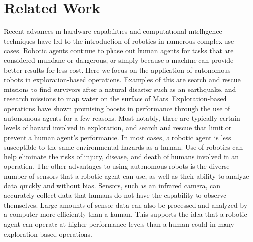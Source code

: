

\chapter{Related Work} \label{ch:related_works}
Recent advances in hardware capabilities and computational intelligence techniques have led to the introduction of robotics in numerous complex use cases.
Robotic agents continue to phase out human agents for tasks that are considered mundane or dangerous, or simply because a machine can provide better results for less cost.
Here we focus on the application of autonomous robots in exploration-based operations.
Examples of this are search and rescue missions to find survivors after a natural disaster such as an earthquake, and research missions to map water on the surface of Mars.
Exploration-based operations have shown promising boosts in performance through the use of autonomous agents for a few reasons.
Most notably, there are typically certain levels of hazard involved in exploration, and search and rescue that limit or prevent a human agent's performance.
In most cases, a robotic agent is less susceptible to the same environmental hazards as a human.
Use of robotics can help eliminate the risks of injury, disease, and death of humans involved in an operation.
The other advantages to using autonomous robots is the diverse number of sensors that a robotic agent can use, as well as their ability to analyze data quickly and without bias.
Sensors, such as an infrared camera, can accurately collect data that humans do not have the capability to observe themselves.
Large amounts of sensor data can also be processed and analyzed by a computer more efficiently than a human.
This supports the idea that a robotic agent can operate at higher performance levels than a human could in many exploration-based operations.

